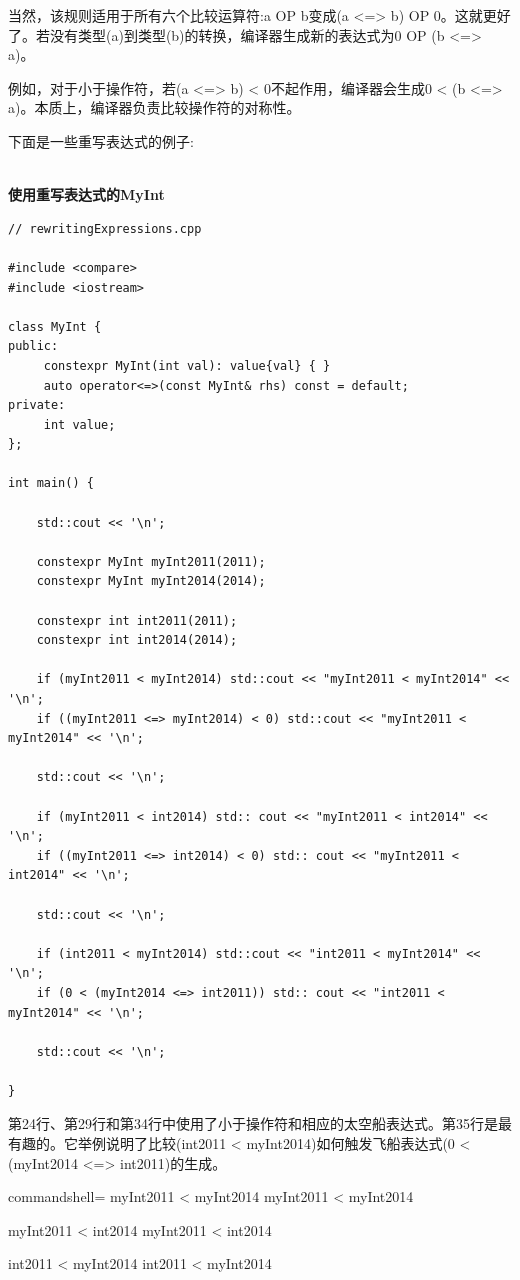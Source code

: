 当然，该规则适用于所有六个比较运算符:a OP b变成(a <=> b) OP 0。这就更好了。若没有类型(a)到类型(b)的转换，编译器生成新的表达式为0 OP (b <=> a)。

例如，对于小于操作符，若(a <=> b) < 0不起作用，编译器会生成0 < (b <=> a)。本质上，编译器负责比较操作符的对称性。

下面是一些重写表达式的例子:

\hspace*{\fill} \\ %
\noindent
\textbf{使用重写表达式的MyInt}
\begin{lstlisting}[style=styleCXX]
// rewritingExpressions.cpp

#include <compare>
#include <iostream>

class MyInt {
public:
	 constexpr MyInt(int val): value{val} { }
	 auto operator<=>(const MyInt& rhs) const = default;
private:
	 int value;
};

int main() {
	
	std::cout << '\n';
	
	constexpr MyInt myInt2011(2011);
	constexpr MyInt myInt2014(2014);
	
	constexpr int int2011(2011);
	constexpr int int2014(2014);
	
	if (myInt2011 < myInt2014) std::cout << "myInt2011 < myInt2014" << '\n';
	if ((myInt2011 <=> myInt2014) < 0) std::cout << "myInt2011 < myInt2014" << '\n';
	
	std::cout << '\n';
	
	if (myInt2011 < int2014) std:: cout << "myInt2011 < int2014" << '\n';
	if ((myInt2011 <=> int2014) < 0) std:: cout << "myInt2011 < int2014" << '\n';
	
	std::cout << '\n';
	
	if (int2011 < myInt2014) std::cout << "int2011 < myInt2014" << '\n';
	if (0 < (myInt2014 <=> int2011)) std:: cout << "int2011 < myInt2014" << '\n';
	
	std::cout << '\n';

}
\end{lstlisting}

第24行、第29行和第34行中使用了小于操作符和相应的太空船表达式。第35行是最有趣的。它举例说明了比较(int2011 < myInt2014)如何触发飞船表达式(0 < (myInt2014 <=> int2011)的生成。

\begin{tcblisting}{commandshell={}}
myInt2011 < myInt2014
myInt2011 < myInt2014

myInt2011 < int2014
myInt2011 < int2014

int2011 < myInt2014
int2011 < myInt2014
\end{tcblisting}


